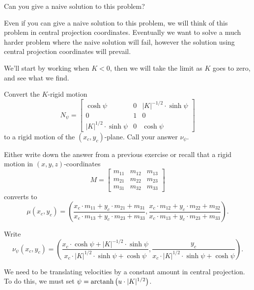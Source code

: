 \documentclass[12pt,noauthor,nooutcomes,handout,hints,newpage]{ximera}
\begin{document}
\begin{problem}
  Can you give a naive solution to this problem?
\end{problem}


Even if you can give a naive solution to this problem, we will think
of this problem in central projection coordinates. Eventually we want
to solve a much harder problem where the naive solution will fail,
however the solution using central projection coordinates will
prevail. 

We'll start by working when $K<0$, then we will take the limit as $K$
goes to zero, and see what we find.

\begin{problem}
  Convert the $K$-rigid motion
  \[
  N_\psi=\begin{bmatrix}
  \cosh\psi & 0 & |K|^{-1/2}\cdot\sinh\psi\\
  0 & 1 & 0\\
  |K|^{1/2}\cdot\sinh\psi & 0 & \cosh\psi
\end{bmatrix}
  \]
  to a rigid motion of the $(x_c,y_c)$-plane. Call your answer $\nu_\psi$.
  \begin{hint}
    Either write down the answer from a previous exercise or recall
    that a rigid motion in $(x,y,z)$-coordinates
    \[
    M=\begin{bmatrix}
    m_{11} & m_{12} & m_{13}\\
    m_{21} & m_{22} & m_{23}\\
    m_{31} & m_{32} & m_{33}
    \end{bmatrix}
    \]
    converts to
    \[
    \mu(x_c,y_c) = \left(
    \frac{x_c\cdot m_{11} + y_c\cdot m_{21} + m_{31}}{x_c\cdot m_{13} + y_c\cdot m_{23} + m_{33}},
    \frac{x_c\cdot m_{12} + y_c\cdot m_{22} + m_{32}}{x_c\cdot m_{13} + y_c\cdot m_{23} + m_{33}}
    \right).
    \]
  \end{hint}
  \begin{freeResponse}
    Write
    \[
    \nu_\psi(x_c,y_c) = \left(\frac{x_c\cdot\cosh\psi+|K|^{-1/2}\cdot\sinh\psi}{x_c\cdot|K|^{1/2}\cdot\sinh\psi+\cosh\psi},\frac{y_c}{x_c\cdot|K|^{1/2}\cdot\sinh\psi+\cosh\psi}\right).
    \]
  \end{freeResponse}
\end{problem}

We need to be translating velocities by a constant amount in central
projection. To do this, we must set $\psi =\operatorname{arctanh}\left(u\cdot|K|^{1/2}\right)$.
\end{document}

